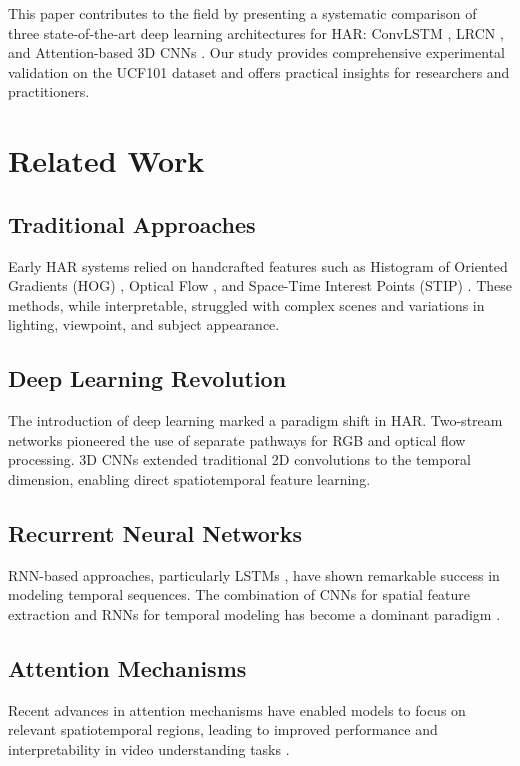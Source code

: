 \documentclass[twocolumn]{article}
\begin{document}
This paper contributes to the field by presenting a systematic comparison of three state-of-the-art deep learning architectures for HAR: ConvLSTM \cite{xingjian2015convolutional}, LRCN \cite{donahue2015long}, and Attention-based 3D CNNs \cite{vaswani2017attention}. Our study provides comprehensive experimental validation on the UCF101 dataset and offers practical insights for researchers and practitioners.

\section{Related Work}

\subsection{Traditional Approaches}
Early HAR systems relied on handcrafted features such as Histogram of Oriented Gradients (HOG) \cite{dalal2005histograms}, Optical Flow \cite{lucas1981iterative}, and Space-Time Interest Points (STIP) \cite{laptev2005space}. These methods, while interpretable, struggled with complex scenes and variations in lighting, viewpoint, and subject appearance.

\subsection{Deep Learning Revolution}
The introduction of deep learning marked a paradigm shift in HAR. Two-stream networks \cite{simonyan2014two} pioneered the use of separate pathways for RGB and optical flow processing. 3D CNNs \cite{ji20133d} extended traditional 2D convolutions to the temporal dimension, enabling direct spatiotemporal feature learning.

\subsection{Recurrent Neural Networks}
RNN-based approaches, particularly LSTMs \cite{hochreiter1997long}, have shown remarkable success in modeling temporal sequences. The combination of CNNs for spatial feature extraction and RNNs for temporal modeling has become a dominant paradigm \cite{donahue2015long}.

\subsection{Attention Mechanisms}
Recent advances in attention mechanisms \cite{vaswani2017attention} have enabled models to focus on relevant spatiotemporal regions, leading to improved performance and interpretability in video understanding tasks \cite{wang2018non}.
\end{document}
